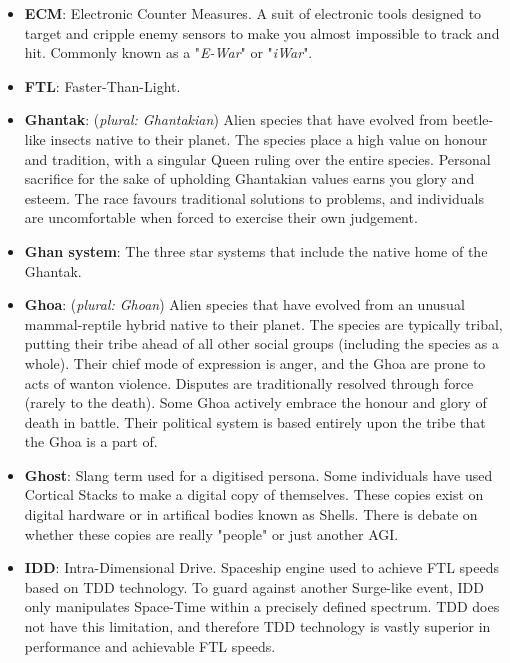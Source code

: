 \documentclass[10pt,twoside]{article}
\begin{document}
\begin{multicols}{2}
\begin{itemize}
    \item \textbf{ECM}: Electronic Counter Measures. A suit of electronic tools designed to target and cripple enemy sensors to make you almost impossible to track and hit. Commonly known as a "\textit{E-War}" or "\textit{iWar}".

    \item \textbf{FTL}: Faster-Than-Light.

    \item \textbf{Ghantak}: (\textit{plural: Ghantakian}) Alien species that have evolved from beetle-like insects native to their planet. The species place a high value on honour and tradition, with a singular Queen ruling over the entire species. Personal sacrifice for the sake of upholding Ghantakian values earns you glory and esteem. The race favours traditional solutions to problems, and individuals are uncomfortable when forced to exercise their own judgement.
    
    \item \textbf{Ghan system}: The three star systems that include the native home of the Ghantak.

    \item \textbf{Ghoa}: (\textit{plural: Ghoan}) Alien species that have evolved from an unusual mammal-reptile hybrid native to their planet. The species are typically tribal, putting their tribe ahead of all other social groups (including the species as a whole). Their chief mode of expression is anger, and the Ghoa are prone to acts of wanton violence. Disputes are traditionally resolved through force (rarely to the death). Some Ghoa actively embrace the honour and glory of death in battle. Their political system is based entirely upon the tribe that the Ghoa is a part of.

    \item \textbf{Ghost}: Slang term used for a digitised persona. Some individuals have used Cortical Stacks to make a digital copy of themselves. These copies exist on digital hardware or in artifical bodies known as Shells. There is debate on whether these copies are really "people" or just another AGI.

    \item \textbf{IDD}: Intra-Dimensional Drive. Spaceship engine used to achieve FTL speeds based on TDD technology. To guard against another Surge-like event, IDD only manipulates Space-Time within a precisely defined spectrum. TDD does not have this limitation, and therefore TDD technology is vastly superior in performance and achievable FTL speeds.
    

\end{itemize}
\end{multicols}
\end{document}
